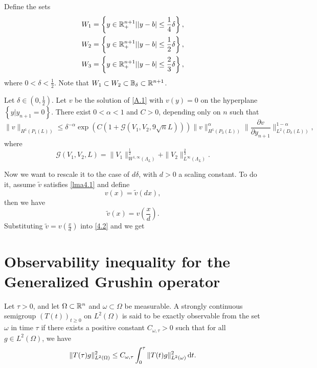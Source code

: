Define the sets
\begin{equation*}
	\begin{aligned}
		W_1&= \left\{y \in \mathbb{R}^{n+1}_{+}\lvert |y-b|\le \frac{1}{4}\delta\right\}, \\
		W_2&= \left\{y\in \mathbb{R}_{+}^{n+1}\lvert |y-b|\le \frac{1}{2} \delta\right\}, \\
		W_3&=\left\{y\in \mathbb{R}^{n+1}_{+}\lvert |y-b|\le \frac{2}{3}\delta\right\} ,
	\end{aligned}
\end{equation*}where $0<\delta<\frac{1}{2}$. Note that $W_1\subset W_2\subset \mathbb{B}_{\delta}\subset \mathbb{R}^{n+1}$.

\begin{lemma}\label{lma4.1}
	Let $ \delta \in \left( 0,\frac{1}{2} \right) $. Let $v$ be the solution of \cref{A.1} with $v(y)=0$ on the hyperplane $\left\{y|y_{n+1}=0\right\} $. There exist $0<\alpha <1$ and $C>0$, depending only on $n$ such that
	\begin{equation}\label{4.2}
		\|v\|_{H^{1}\left( P_1(L) \right) }\le \delta^{-\alpha }\exp \left( C\left( 1+\mathcal{G}\left( V_1,V_2,9\sqrt{n} L \right)  \right)  \right) \|v\|^{\alpha }_{H^{1}\left( P_3(L) \right) }\|\frac{\partial v}{\partial y_{n+1}}\|^{1-\alpha }_{L^2\left( D_\delta\left( L \right)  \right) },
	\end{equation}
	where
	\begin{equation}
		\mathcal{G}\left( V_1,V_2,L \right) =\|V_1\|_{W^{1,\infty}\left( \Lambda_L \right) }^{\frac{1}{2}}+\|V_2\|^{\frac{2}{3}}_{L^{\infty}\left( \Lambda_L \right) }.
	\end{equation}
\end{lemma}
Now we want to rescale it to the case of $d \delta$, with $d>0$ a scaling constant. To do it, assume $\widetilde{v}$ satisfies \cref{lma4.1} and define
\[
v(x)=\widetilde{v}(dx),
\] 
then we have
\[
\widetilde{v}(x)= v\left( \frac{x}{d} \right). 
\] 
Substituting $\widetilde{v}=v\left( \frac{x}{d} \right) $ into \cref{4.2} and we get


\section{Observability inequality for the Generalized Grushin operator}

\begin{definition}
	Let $\tau>0$, and let  $\Omega\subset \mathbb{R}^{n}$ and $\omega\subset \Omega$ be measurable. A strongly continuous semigroup $\left( T(t) \right)_{t\ge 0} $ on $L^2(\Omega)$ is said to be exactly observable from the set $\omega$ in time $\tau $ if there exists a positive constant $C_{\omega,\tau }>0$ such that for all $g\in L^2(\Omega)$, we have
	\[
	\|T(\tau)g\|^2_{L^2(\Omega)}\le C_{\omega,\tau }\int_0^{\tau }\|T(t)g\|^2_{L^2(\omega)}\,\mathrm{d} t.
	\] 
\end{definition}

